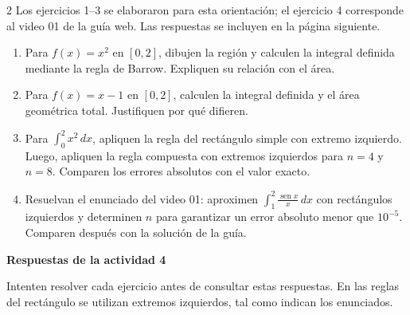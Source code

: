 \documentclass[10pt,letterpaper]{article}
\begin{document}
\begin{multicols}{2}
Los ejercicios 1--3 se elaboraron para esta orientación; el ejercicio 4 corresponde al video 01 de la guía web. Las respuestas se incluyen en la página siguiente.
\begin{enumerate}
\item Para $f(x)=x^2$ en $[0,2]$, dibujen la región y calculen la integral definida mediante la regla de Barrow. Expliquen su relación con el área.
\item Para $f(x)=x-1$ en $[0,2]$, calculen la integral definida y el área geométrica total. Justifiquen por qué difieren.
\item Para $\int_0^2 x^2\,dx$, apliquen la regla del rectángulo simple con extremo izquierdo. Luego, apliquen la regla compuesta con extremos izquierdos para $n=4$ y $n=8$. Comparen los errores absolutos con el valor exacto.
\item Resuelvan el enunciado del video 01: aproximen $\int_1^2 \frac{\operatorname{sen}x}{x}\,dx$ con rectángulos izquierdos y determinen $n$ para garantizar un error absoluto menor que $10^{-5}$. Comparen después con la solución de la guía.
\end{enumerate}
\end{multicols}

{ \fboxsep 12pt
}


\newpage
{\color{titulos}\Large\textbf{Respuestas de la actividad 4}}

Intenten resolver cada ejercicio antes de consultar estas respuestas. En las reglas del rectángulo se utilizan extremos izquierdos, tal como indican los enunciados.
\end{document}
